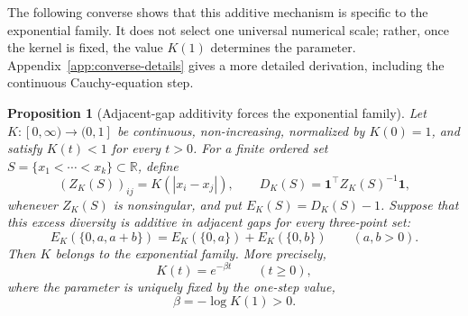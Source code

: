 \documentclass[12pt,a4paper]{article}
\newtheorem{proposition}{Proposition}
\begin{document}
The following converse shows that this additive mechanism is specific to the exponential family.  It does not select one universal numerical scale; rather, once the kernel is fixed, the value $K(1)$ determines the parameter.  Appendix~\ref{app:converse-details} gives a more detailed derivation, including the continuous Cauchy-equation step.

\begin{proposition}[Adjacent-gap additivity forces the exponential family]
\label{prop:converse-exponential-kernel}
Let $K:[0,\infty)\to(0,1]$ be continuous, non-increasing, normalized by $K(0)=1$, and satisfy $K(t)<1$ for every $t>0$.  For a finite ordered set $S=\{x_1<\cdots<x_k\}\subset\mathbb{R}$, define
\[
  (Z_K(S))_{ij}=K(|x_i-x_j|),
  \qquad
  D_K(S)=\mathbf{1}^\top Z_K(S)^{-1}\mathbf{1},
\]
whenever $Z_K(S)$ is nonsingular, and put $E_K(S)=D_K(S)-1$.  Suppose that this excess diversity is additive in adjacent gaps for every three-point set:
\begin{equation}
\label{eq:three-point-excess-additivity}
  E_K(\{0,a,a+b\})
  =E_K(\{0,a\})+E_K(\{0,b\})
  \qquad (a,b>0).
\end{equation}
Then $K$ belongs to the exponential family.  More precisely,
\[
  K(t)=e^{-\beta t}\qquad(t\geq0),
\]
where the parameter is uniquely fixed by the one-step value,
\[
  \beta=-\log K(1)>0.
\]
\end{proposition}
\end{document}
